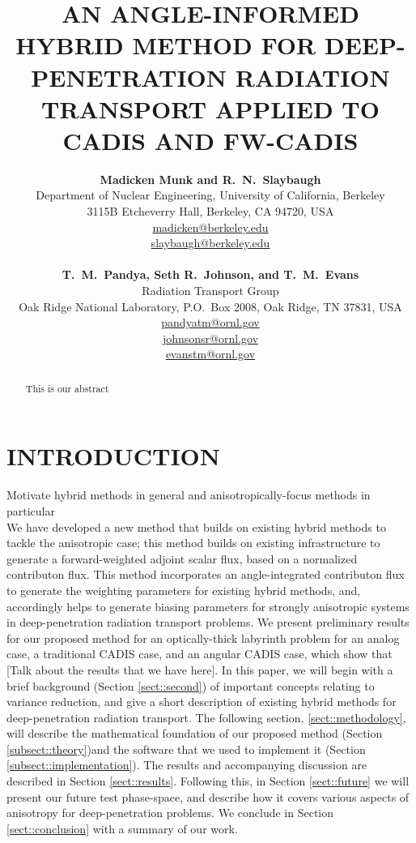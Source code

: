 \documentclass[12pt]{article}
\title{AN ANGLE-INFORMED HYBRID METHOD FOR DEEP-PENETRATION RADIATION TRANSPORT APPLIED TO CADIS AND FW-CADIS}
\author{ 
  \textbf{Madicken Munk and R.~N.~Slaybaugh} \\
  Department of Nuclear Engineering, University of California, Berkeley \\
  3115B Etcheverry Hall, Berkeley, CA 94720, USA\\
  \href{mailto:madicken@berkeley.edu}{madicken@berkeley.edu}\\
  \href{mailto:slaybaugh@berkeley.edu}{slaybaugh@berkeley.edu}\\
  \\
  \textbf{T.~M.~Pandya, Seth R.~Johnson, and T.~M.~Evans}\\
  Radiation Transport Group\\
  Oak Ridge National Laboratory, P.O.\ Box 2008, Oak Ridge, TN 37831, USA\\
  \href{mailto:pandyatm@ornl.gov}{pandyatm@ornl.gov}\\
  \href{mailto:johnsonsr@ornl.gov}{johnsonsr@ornl.gov}\\
  \href{mailto:evanstm@ornl.gov}{evanstm@ornl.gov}
  }
\begin{document}


\maketitle

\begin{abstract}
This is our abstract
\end{abstract}


%
\section{INTRODUCTION}
\label{sect::intro}

Motivate hybrid methods in general and anisotropically-focus methods in particular\\

We have developed a new method that builds on existing hybrid methods to tackle the anisotropic case; this method builds on existing infrastructure to generate a forward-weighted adjoint scalar flux, based on a normalized contributon flux. 
This method incorporates an angle-integrated contributon flux to generate the weighting parameters for existing hybrid methods, and, accordingly helps to generate biasing parameters for strongly anisotropic systems in deep-penetration radiation transport problems. 
We present preliminary results for our proposed method for an optically-thick labyrinth problem for an analog case, a traditional CADIS case, and an angular CADIS case, which show that [Talk about the results that we have here]. 
In this paper, we will begin with a brief background (Section \ref{sect::second}) of important concepts relating to variance reduction, and give a short description of existing hybrid methods for deep-penetration radiation transport.
The following section, \ref{sect::methodology}, will describe the mathematical foundation of our proposed method (Section \ref{subsect::theory})and the software that we used to implement it (Section \ref{subsect::implementation}). 
The results and accompanying discussion are described in Section \ref{sect::results}. Following this, in Section \ref{sect::future} we will present our future test phase-space, and describe how it covers various aspects of anisotropy for deep-penetration problems. We conclude in Section \ref{sect::conclusion} with a summary of our work. 
\end{document}

